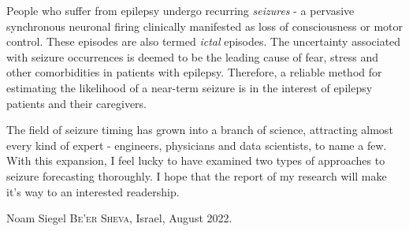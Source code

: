 \documentclass[a4paper, 12pt, \pagelayoutformat, onecolumn, bibliography=totoc]{scrreprt}
\begin{document}


\ifFULL
    
    \thispagestyle{empty} %

    \cleardoubleoddemptypage
    
     
    \thispagestyle{empty} %

    \cleardoubleoddemptypage
 
    
    \thispagestyle{empty} %
    
    \cleardoubleoddemptypage
% 
    
%    
    \cleardoubleoddemptypage
    \setPageStyle
    \pagestyle{plain.scrheadings}
    
    
    \cleardoubleoddemptypage
    \setPageStyle
    \pagestyle{plain.scrheadings}
        People who suffer from epilepsy undergo recurring \emph{seizures} - a pervasive synchronous neuronal firing clinically manifested as loss of consciousness or motor control. These episodes are also termed \emph{ictal} episodes. The uncertainty associated with seizure occurrences is deemed to be the leading cause of fear, stress and other comorbidities in patients with epilepsy. Therefore, a reliable method for estimating the likelihood of a near-term seizure is in the interest of epilepsy patients and their caregivers.
        
        The field of seizure timing has grown into a branch of science, attracting almost every kind of expert - engineers, physicians and data scientists, to name a few. With this expansion, I feel lucky to have examined two types of approaches to seizure forecasting thoroughly. I hope that the report of my research will make it's way to an interested readership. 

    \medskip
    \begin {flushright}
      Noam Siegel \textsc {Be'er Sheva}, Israel, August 2022.
    \end {flushright}
\end{document}
